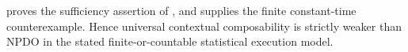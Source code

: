 \documentclass[11pt]{article}
\begin{document}
 proves the sufficiency assertion of , and
 supplies the finite constant-time counterexample.  Hence
universal contextual composability is strictly weaker than NPDO in the stated
finite-or-countable statistical execution model.



\end{document}
